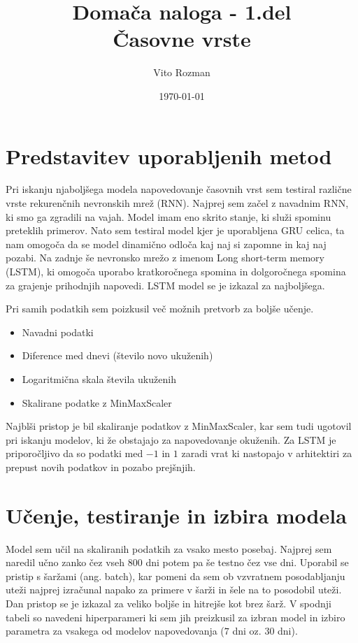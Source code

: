 \documentclass[12pt]{article}
\title{Domača naloga - 1.del \\
\large Časovne vrste}
\begin{document}
    
\author{Vito Rozman}
\date{\today}
\maketitle



\section{Predstavitev uporabljenih metod}

Pri iskanju njaboljšega modela napovedovanje časovnih vrst sem testiral različne 
vrste rekurenčnih nevronskih mrež (RNN). Najprej sem začel z navadnim
RNN, ki smo ga zgradili na vajah. Model imam eno skrito stanje, ki služi spominu 
preteklih primerov. Nato sem testiral model kjer je uporabljena GRU celica,
ta nam omogoča da se model dinamično odloča kaj naj si zapomne in
kaj naj pozabi.
Na zadnje še nevronsko mrežo z imenom Long short-term memory (LSTM), ki 
omogoča uporabo kratkoročnega spomina in dolgoročnega spomina 
za grajenje prihodnjih napovedi.
LSTM model se je izkazal za najboljšega. 

Pri samih podatkih sem poizkusil več možnih pretvorb za boljše učenje.
\begin{itemize}
    \item Navadni podatki
    \item Diference med dnevi  (število novo ukuženih)
    \item Logaritmična skala števila ukuženih 
    \item Skalirane podatke z MinMaxScaler
\end{itemize}
Najblši pristop je bil skaliranje podatkov z MinMaxScaler, kar sem tudi
ugotovil pri iskanju modelov, ki že obstajajo za napovedovanje okuženih.
Za LSTM je priporočljivo da so podatki med $-1$
in $1$ zaradi vrat ki nastopajo v arhitektiri za prepust novih podatkov
in pozabo prejšnjih.

\section{Učenje, testiranje in izbira modela}

Model sem učil na skaliranih podatkih za vsako mesto posebaj. Najprej sem 
naredil učno zanko čez vseh $800$ dni potem pa še testno
čez vse dni. Uporabil se pristip s šaržami (ang. batch), kar pomeni da sem ob 
vzvratnem posodabljanju uteži najprej izračunal napako za primere v šarži
in šele na to posodobil uteži. Dan pristop se je izkazal za veliko boljše in
hitrejše kot brez šarž. V spodnji tabeli so navedeni hiperparameri ki sem jih 
preizkusil za izbran model in izbiro parametra za vsakega
od modelov napovedovanja ($7$ dni oz. $30$ dni).
\end{document}
